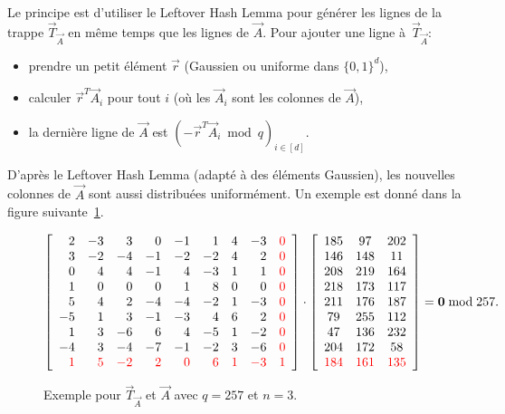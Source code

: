 Le principe est d'utiliser le Leftover Hash Lemma pour générer les lignes de la trappe $\vec{T}_{\vec{A}}$ en même temps que les lignes de $\vec{A}$.
Pour ajouter une ligne à~$\vec{T}_{\vec{A}}$:
\begin{itemize}
\item prendre un petit élément $\vec{r}$ (Gaussien ou uniforme dans $\{0,1\}^d$),
\item calculer $\vec{r}^T \vec{A}_i $ pour tout $i$ (où les $\vec{A}_i$ sont les colonnes de $\vec{A}$),
\item la dernière ligne de $\vec{A}$ est $ (-  \vec{r}^T \vec{A}_i \bmod q)_{i \in [d]}$.
\end{itemize}
D'après le Leftover Hash Lemma (adapté à des éléments Gaussien), les nouvelles colonnes de $\vec{A}$ sont aussi distribuées uniformément.
Un exemple est donné dans la figure suivante~\ref{fig:trapdoorexample}.
\begin{figure}[h!]
\begin{center}
$
\left[
\begin{array}{rrrrrrrrr}
2 & -3 &  3 & 0 & -1 &  1 & 4&  -3 &  \textcolor{red}{0}\\
3 & -2 & -4 & -1 & -2 & -2 &  4 &  2 & \textcolor{red}{0}\\
0 & 4 & 4 &-1 & 4 &-3 & 1 & 1 & \textcolor{red}{0} \\
1 &  0&  0&  0 & 1 & 8 & 0 & 0 & \textcolor{red}{0} \\
5 & 4 & 2 &-4 &-4& -2&  1& -3 & \textcolor{red}{0} \\
-5&  1 & 3 & -1& -3&  4 & 6 & 2 & \textcolor{red}{0}\\
1&  3& -6&  6&  4& -5&  1& -2 & \textcolor{red}{0} \\
-4&  3& -4& -7& -1& -2&  3& -6 & \textcolor{red}{0} \\
\textcolor{red}{1} & \textcolor{red}{5} & \textcolor{red}{-2} & \textcolor{red}{2}  & \textcolor{red}{0} & \textcolor{red}{6} & \textcolor{red}{1} &\textcolor{red}{-3} & \textcolor{red}{1}
\end{array} 
\right]
\cdot
\left[
\begin{array}{ccc}
185 & 97 &202\\
146 & 148 &  11\\
208 & 219 & 164\\
218 & 173 & 117\\
211 & 176 & 187\\
79 & 255 & 112\\
47 & 136 & 232\\
204 & 172 & 58 \\
 \textcolor{red}{184} & \textcolor{red}{161} &  \textcolor{red}{135}
\end{array}
\right]
= \vec{0} \bmod 257.
$
\end{center}
\caption{Exemple pour $\vec{T}_{\vec{A}}$ et $\vec{A}$ avec $q=257$ et $n=3$.}
\label{fig:trapdoorexample}
\end{figure}

